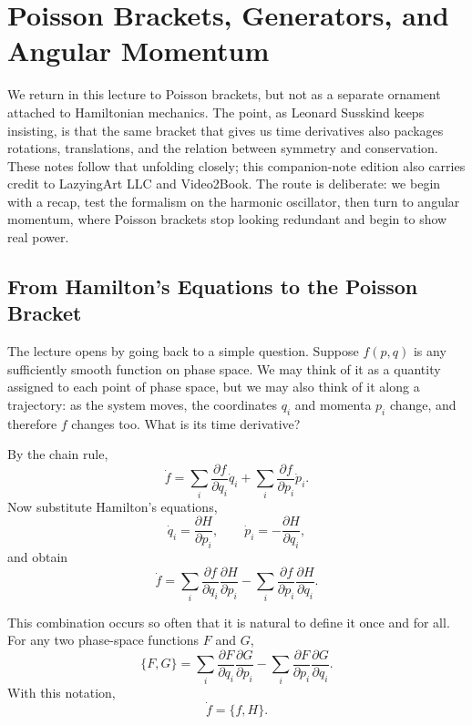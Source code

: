 \chapter{Poisson Brackets, Generators, and Angular Momentum}

We return in this lecture to Poisson brackets, but not as a separate ornament attached to Hamiltonian mechanics. The point, as Leonard Susskind keeps insisting, is that the same bracket that gives us time derivatives also packages rotations, translations, and the relation between symmetry and conservation. These notes follow that unfolding closely; this companion-note edition also carries credit to LazyingArt LLC and Video2Book. The route is deliberate: we begin with a recap, test the formalism on the harmonic oscillator, then turn to angular momentum, where Poisson brackets stop looking redundant and begin to show real power.

\section{From Hamilton's Equations to the Poisson Bracket}

The lecture opens by going back to a simple question. Suppose \(f(p,q)\) is any sufficiently smooth function on phase space. We may think of it as a quantity assigned to each point of phase space, but we may also think of it along a trajectory: as the system moves, the coordinates \(q_i\) and momenta \(p_i\) change, and therefore \(f\) changes too. What is its time derivative?

By the chain rule,
\begin{equation}
\dot f=\sum_i \frac{\partial f}{\partial q_i}\dot q_i+\sum_i \frac{\partial f}{\partial p_i}\dot p_i.
\end{equation}
Now substitute Hamilton's equations,
\begin{equation}
\dot q_i=\frac{\partial H}{\partial p_i},\qquad \dot p_i=-\frac{\partial H}{\partial q_i},
\end{equation}
and obtain
\begin{equation}
\dot f=\sum_i \frac{\partial f}{\partial q_i}\frac{\partial H}{\partial p_i}
-\sum_i \frac{\partial f}{\partial p_i}\frac{\partial H}{\partial q_i}.
\end{equation}

This combination occurs so often that it is natural to define it once and for all. For any two phase-space functions \(F\) and \(G\),
\begin{equation}
\{F,G\}=\sum_i \frac{\partial F}{\partial q_i}\frac{\partial G}{\partial p_i}
-\sum_i \frac{\partial F}{\partial p_i}\frac{\partial G}{\partial q_i}.
\end{equation}
With this notation,
\begin{equation}
\dot f=\{f,H\}.
\end{equation}

